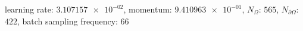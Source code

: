 learning rate: $\num[scientific-notation=true]{3.107157e-02}$, momentum: $\num[scientific-notation=true]{9.410963e-01}$, $N_{\Omega}$: $\num[scientific-notation=false]{565}$, $N_{\partial\Omega}$: $\num[scientific-notation=false]{422}$, batch sampling frequency: $\num[scientific-notation=false]{66}$